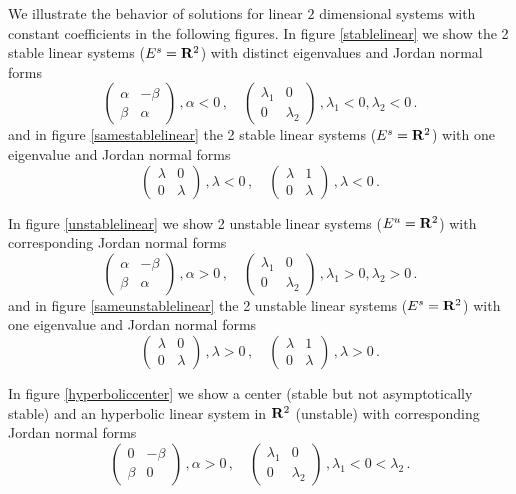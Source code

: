 \documentclass[12pt]{report}
\newcommand{\bR}{{\bf R}}
\begin{document}
We illustrate the behavior of solutions for linear $2$ dimensional
systems with constant coefficients in the following figures.  In
figure \ref{stablelinear} we show the 2 stable linear systems
($E^{s}=\bR^2$) with distinct eigenvalues and Jordan normal forms
$$ \left(\begin{array}{cc} \alpha & -\beta \\ \beta & \alpha
\end{array} \right)\,, \alpha < 0 \,, \quad
\left(\begin{array}{cc}\lambda_1& 0 \\ 0 & \lambda_2\end{array}
\right)\,, \lambda_1 < 0, \lambda_2 < 0 \,.
$$ and in figure \ref{samestablelinear} the 2 stable linear systems
($E^{s}=\bR^2$) with one eigenvalue and Jordan normal forms
$$ 
\left(\begin{array}{cc}\lambda& 0 \\ 0 & \lambda \end{array}
\right)\,, \lambda < 0 \,, \quad \left(\begin{array}{cc} \lambda & 1
\\ 0 & \lambda \end{array} \right)\,, \lambda < 0 \,.
$$



In figure \ref{unstablelinear} we show 2 unstable linear systems
($E^{u}=\bR^2$) with corresponding Jordan normal forms
$$
\left(\begin{array}{cc} \alpha & -\beta \\ \beta &  \alpha \end{array} 
\right)\,, \alpha >  0\,,\quad \left(\begin{array}{cc}\lambda_1& 0 \\ 0 & 
\lambda_2\end{array} \right)\,, \lambda_1 > 0, \lambda_2 > 0\,.
$$ and in figure \ref{sameunstablelinear} the 2 unstable linear
systems ($E^{s}=\bR^2$) with one eigenvalue and Jordan normal forms
$$ \left(\begin{array}{cc}\lambda& 0 \\ 0 & \lambda \end{array}
\right)\,, \lambda > 0 \,, \quad \left(\begin{array}{cc} \lambda & 1
\\ 0 & \lambda \end{array} \right)\,, \lambda > 0 \,.
$$


In figure \ref{hyperboliccenter} we show a center (stable but not
asymptotically stable) and an hyperbolic linear system in $\bR^2$
(unstable) with corresponding Jordan normal forms
$$ 
\left(\begin{array}{cc} 0 & -\beta \\ \beta & 0 \end{array}
\right)\,, \alpha > 0\,, \quad \left(\begin{array}{cc}\lambda_1& 0 \\
0 & \lambda_2\end{array} \right)\,, \lambda_1 < 0 < \lambda_2 \,.
$$
\end{document}
